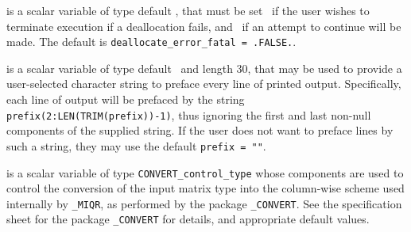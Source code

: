 \documentclass{galahad}
\newcommand{\packagename}{MIQR}
\newcommand{\fullpackagename}{\libraryname\_\packagename}
\begin{document}
\begin{description}
 is a scalar variable of type default \logical,
that must be set \true\ if the user wishes to terminate execution if
a deallocation  fails, and \false\ if an attempt to continue
will be made. The default is {\tt deallocate\_error\_fatal = .FALSE.}.

 is a scalar variable of type default \character\
and length 30, that may be used to provide a user-selected
character string to preface every line of printed output.
Specifically, each line of output will be prefaced by the string
{\tt prefix(2:LEN(TRIM(prefix))-1)},
thus ignoring the first and last non-null components of the
supplied string. If the user does not want to preface lines by such
a string, they may use the default {\tt prefix = ""}.

 is a scalar variable of type
{\tt CONVERT\_control\_type}
whose components are used to control the conversion of the
input matrix type into the column-wise scheme used internally
by  {\tt \fullpackagename}, as performed by the package
{\tt \libraryname\_CONVERT}.
See the specification sheet for the package
{\tt \libraryname\_CONVERT}
for details, and appropriate default values.

\end{description}

\end{document}
